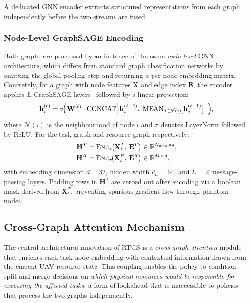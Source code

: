 A dedicated GNN encoder extracts structured representations from
each graph independently before the two streams are fused.

\subsubsection*{Node-Level GraphSAGE Encoding}

Both graphs are processed by an instance of the same
\textit{node-level} GNN architecture, which differs from standard
graph classification networks by omitting the global pooling step
and returning a per-node embedding matrix.
Concretely, for a graph with node features $\mathbf{X}$ and edge
index $\mathbf{E}$, the encoder applies $L$ GraphSAGE
layers~\cite{hamilton2017inductive} followed by a linear projection:
\begin{equation}
  \mathbf{h}_i^{(\ell)} = \sigma\!\Bigl(
    \mathbf{W}^{(\ell)} \cdot \mathrm{CONCAT}\Bigl[
      \mathbf{h}_i^{(\ell-1)},\;
      \mathrm{MEAN}_{j \in \mathcal{N}(i)}\!\bigl[
        \mathbf{h}_j^{(\ell-1)}
      \bigr]
    \Bigr]
  \Bigr),
  \label{eq:sage}
\end{equation}
where $\mathcal{N}(i)$ is the neighbourhood of node $i$
and $\sigma$ denotes LayerNorm followed by ReLU.
For the task graph and resource graph respectively:
\begin{align}
  \mathbf{H}^T &= \textsc{Enc}_\tau\!\bigl(
                   \mathbf{X}^T_t,\,\mathbf{E}^T_t
                 \bigr) \in \mathbb{R}^{N_{\max} \times d},
  \label{eq:enc_task}\\
  \mathbf{H}^R &= \textsc{Enc}_r\!\bigl(
                   \mathbf{X}^R_t,\,\mathbf{E}^R
                 \bigr) \in \mathbb{R}^{M \times d},
  \label{eq:enc_res}
\end{align}
with embedding dimension $d = 32$, hidden width $d_h = 64$,
and $L = 2$ message-passing layers.
Padding rows in $\mathbf{H}^T$ are zeroed out after encoding via a
boolean mask derived from $\mathbf{X}^T_t$, preventing spurious
gradient flow through phantom nodes.

\subsection{Cross-Graph Attention Mechanism}
\label{subsec:attention}

The central architectural innovation of RTGS is a
\emph{cross-graph attention} module that enriches each task node
embedding with contextual information drawn from the current UAV
resource state.
This coupling enables the policy to condition split and merge
decisions on \emph{which physical resources would be responsible for
executing the affected tasks}, a form of lookahead that is
inaccessible to policies that process the two graphs independently.

